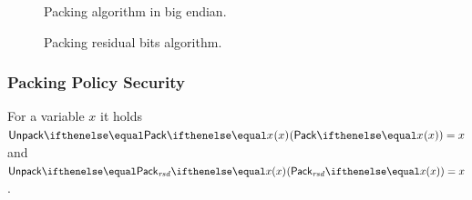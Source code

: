 \begin{figure}
    \begin{minipage}[t]{.4\textwidth}
        \centering
        \caption{Packing algorithm in big endian.}\label{zeth-protocol:fig:packing-alg}
    \end{minipage}%
    \begin{minipage}[t]{.6\textwidth}
        \centering
        \caption{Packing residual bits algorithm.}\label{zeth-protocol:fig:packing-resbits-alg}
    \end{minipage}
\end{figure}

\subsubsection{Packing Policy Security}
\begin{proposition}
    For a variable $x$ it holds $\unpack{\pack{x}{}}{} = x$ and 
    $\unpack{\packResBits{x}}{} = x$.
\end{proposition}

